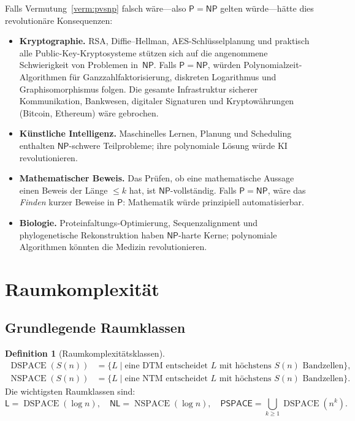 \documentclass[12pt,a4paper]{amsart}
\theoremstyle{definition}
\newtheorem{definition}[theorem]{Definition}
\newcommand{\Pclass}{\mathsf{P}}
\newcommand{\NP}{\mathsf{NP}}
\newcommand{\PSPACE}{\mathsf{PSPACE}}
\newcommand{\Lclass}{\mathsf{L}}
\newcommand{\NL}{\mathsf{NL}}
\DeclareMathOperator{\DSPACE}{DSPACE}
\DeclareMathOperator{\NSPACE}{NSPACE}
\begin{document}
Falls Vermutung~\ref{verm:pvsnp} falsch wäre---also $\Pclass = \NP$ gelten
würde---hätte dies revolutionäre Konsequenzen:

\begin{itemize}
  \item \textbf{Kryptographie.}  RSA, Diffie--Hellman, AES-Schlüsselplanung
    und praktisch alle Public-Key-Kryptosysteme stützen sich auf die
    angenommene Schwierigkeit von Problemen in~$\NP$.  Falls $\Pclass=\NP$,
    würden Polynomialzeit-Algorithmen für Ganzzahlfaktorisierung, diskreten
    Logarithmus und Graphisomorphismus folgen.  Die gesamte Infrastruktur
    sicherer Kommunikation, Bankwesen, digitaler Signaturen und
    Kryptowährungen (Bitcoin, Ethereum) wäre gebrochen.
  \item \textbf{Künstliche Intelligenz.}  Maschinelles Lernen, Planung und
    Scheduling enthalten $\NP$-schwere Teilprobleme; ihre polynomiale Lösung
    würde KI revolutionieren.
  \item \textbf{Mathematischer Beweis.}  Das Prüfen, ob eine mathematische
    Aussage einen Beweis der Länge $\leq k$ hat, ist $\NP$-vollständig.
    Falls $\Pclass=\NP$, wäre das \emph{Finden} kurzer Beweise in $\Pclass$:
    Mathematik würde prinzipiell automatisierbar.
  \item \textbf{Biologie.}  Proteinfaltungs-Optimierung, Sequenzalignment
    und phylogenetische Rekonstruktion haben $\NP$-harte Kerne; polynomiale
    Algorithmen könnten die Medizin revolutionieren.
\end{itemize}

\section{Raumkomplexität}
\label{sec:raum}

\subsection{Grundlegende Raumklassen}

\begin{definition}[Raumkomplexitätsklassen]
\begin{align*}
  \DSPACE(S(n)) &= \{L \mid \text{eine DTM entscheidet }L\text{ mit höchstens }S(n)\text{ Bandzellen}\},\\
  \NSPACE(S(n)) &= \{L \mid \text{eine NTM entscheidet }L\text{ mit höchstens }S(n)\text{ Bandzellen}\}.
\end{align*}
Die wichtigsten Raumklassen sind:
\[
  \Lclass = \DSPACE(\log n),\quad
  \NL = \NSPACE(\log n),\quad
  \PSPACE = \bigcup_{k\geq 1}\DSPACE(n^k).
\]
\end{definition}
\end{document}
